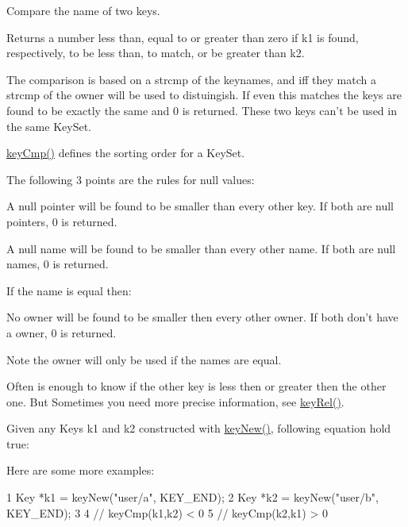 Compare the name of two keys. 

\begin{DoxyReturn}{Returns}
a number less than, equal to or greater than zero if k1 is found, respectively, to be less than, to match, or be greater than k2.
\end{DoxyReturn}
The comparison is based on a strcmp of the keynames, and iff they match a strcmp of the owner will be used to distuingish. If even this matches the keys are found to be exactly the same and 0 is returned. These two keys can't be used in the same Key\+Set.

\hyperlink{group__keytest_gaf6e66e12fe04d535a5d1c8218ced803e}{key\+Cmp()} defines the sorting order for a Key\+Set.

The following 3 points are the rules for null values\+:


\begin{DoxyItemize}
\item A null pointer will be found to be smaller than every other key. If both are null pointers, 0 is returned.
\item A null name will be found to be smaller than every other name. If both are null names, 0 is returned.
\end{DoxyItemize}

If the name is equal then\+:


\begin{DoxyItemize}
\item No owner will be found to be smaller then every other owner. If both don't have a owner, 0 is returned.
\end{DoxyItemize}

\begin{DoxyNote}{Note}
the owner will only be used if the names are equal.
\end{DoxyNote}
Often is enough to know if the other key is less then or greater then the other one. But Sometimes you need more precise information, see \hyperlink{group__keytest_ga6bb0f95ac34ce9c42d61bb35a76139d0}{key\+Rel()}.

Given any Keys k1 and k2 constructed with \hyperlink{group__key_gad23c65b44bf48d773759e1f9a4d43b89}{key\+New()}, following equation hold true\+:


\begin{DoxyCodeInclude}
\end{DoxyCodeInclude}
 Here are some more examples\+: 
\begin{DoxyCode}
1 Key *k1 = keyNew("user/a", KEY\_END);
2 Key *k2 = keyNew("user/b", KEY\_END);
3 
4 // keyCmp(k1,k2) < 0
5 // keyCmp(k2,k1) > 0
\end{DoxyCode}


